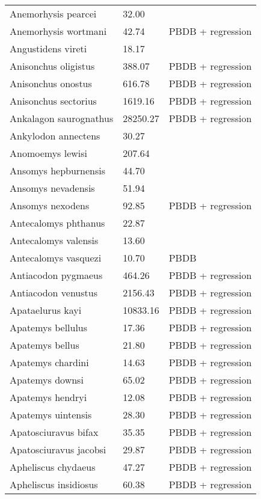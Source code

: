 \documentclass{article}
\begin{document}
\begin{center}
\begin{longtable}{p{} p{} p{}}
    Anemorhysis pearcei & 32.00 & \cite{Albright2000} \\ 
    Anemorhysis wortmani & 42.74 & PBDB + regression \\ 
    Angustidens vireti & 18.17 & \cite{Tomiya2013} \\ 
    Anisonchus oligistus & 388.07 & PBDB + regression \\ 
    Anisonchus onostus & 616.78 & PBDB + regression \\ 
    Anisonchus sectorius & 1619.16 & PBDB + regression \\ 
    Ankalagon saurognathus & 28250.27 & PBDB + regression \\ 
    Ankylodon annectens & 30.27 & \cite{Tomiya2013} \\ 
    Anomoemys lewisi & 207.64 & \cite{Simons1960} \\ 
    Ansomys hepburnensis & 44.70 & \cite{Tomiya2013} \\ 
    Ansomys nevadensis & 51.94 & \cite{Tomiya2013} \\ 
    Ansomys nexodens & 92.85 & PBDB + regression \\ 
    Antecalomys phthanus & 22.87 & \cite{Tomiya2013} \\ 
    Antecalomys valensis & 13.60 & \cite{Tomiya2013} \\ 
    Antecalomys vasquezi & 10.70 & PBDB \\ 
    Antiacodon pygmaeus & 464.26 & PBDB + regression \\ 
    Antiacodon venustus & 2156.43 & PBDB + regression \\ 
    Apataelurus kayi & 10833.16 & PBDB + regression \\ 
    Apatemys bellulus & 17.36 & PBDB + regression \\ 
    Apatemys bellus & 21.80 & PBDB + regression \\ 
    Apatemys chardini & 14.63 & PBDB + regression \\ 
    Apatemys downsi & 65.02 & PBDB + regression \\ 
    Apatemys hendryi & 12.08 & PBDB + regression \\ 
    Apatemys uintensis & 28.30 & PBDB + regression \\ 
    Apatosciuravus bifax & 35.35 & PBDB + regression \\ 
    Apatosciuravus jacobsi & 29.87 & PBDB + regression \\ 
    Apheliscus chydaeus & 47.27 & PBDB + regression \\ 
    Apheliscus insidiosus & 60.38 & PBDB + regression \\ 

\end{longtable}
\end{center}
\end{document}
